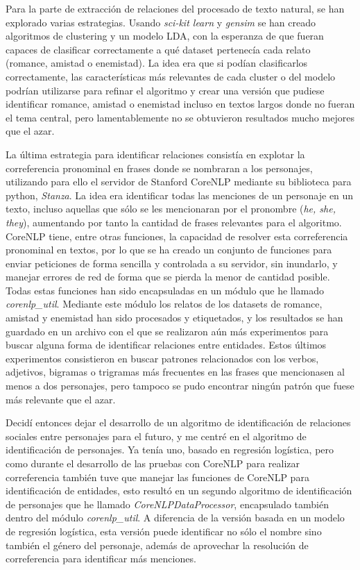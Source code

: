 \documentclass{pre-tfg}
\begin{document}
Para la parte de extracción de relaciones del procesado de texto natural, se han explorado varias estrategias. Usando \textit{sci-kit learn} y \textit{gensim} se han creado algoritmos de clustering y un modelo LDA, con la esperanza de que fueran capaces de clasificar correctamente a qué dataset pertenecía cada relato (romance, amistad o enemistad). La idea era que si podían clasificarlos correctamente, las características más relevantes de cada cluster o del modelo podrían utilizarse para refinar el algoritmo y crear una versión que pudiese identificar romance, amistad o enemistad incluso en textos largos donde no fueran el tema central, pero lamentablemente no se obtuvieron resultados mucho mejores que el azar.

La última estrategia para identificar relaciones consistía en explotar la correferencia pronominal en frases donde se nombraran a los personajes, utilizando para ello el servidor de Stanford CoreNLP mediante su biblioteca para python, \textit{Stanza}. La idea era identificar todas las menciones de un personaje en un texto, incluso aquellas que sólo se les mencionaran por el pronombre (\textit{he, she, they}), aumentando por tanto la cantidad de frases relevantes para el algoritmo. CoreNLP tiene, entre otras funciones, la capacidad de resolver esta correferencia pronominal en textos, por lo que se ha creado un conjunto de funciones para enviar peticiones de forma sencilla y controlada a su servidor, sin inundarlo, y manejar errores de red de forma que se pierda la menor de cantidad posible. Todas estas funciones han sido encapsuladas en un módulo que he llamado \textit{corenlp\_util}. Mediante este módulo los relatos de los datasets de romance, amistad y enemistad han sido procesados y etiquetados, y los resultados se han guardado en un archivo con el que se realizaron aún más experimentos para buscar alguna forma de identificar relaciones entre entidades. Estos últimos experimentos consistieron en buscar patrones relacionados con los verbos, adjetivos, bigramas o trigramas más frecuentes en las frases que mencionasen al menos a dos personajes, pero tampoco se pudo encontrar ningún patrón que fuese más relevante que el azar.

Decidí entonces dejar el desarrollo de un algoritmo de identificación de relaciones sociales entre personajes para el futuro, y me centré en el algoritmo de identificación de personajes. Ya tenía uno, basado en regresión logística, pero como durante el desarrollo de las pruebas con CoreNLP para realizar correferencia también tuve que manejar las funciones de CoreNLP para identificación de entidades, esto resultó en un segundo algoritmo de identificación de personajes que he llamado \textit{CoreNLPDataProcessor}, encapsulado también dentro del módulo \textit{corenlp\_util}. A diferencia de la versión basada en un modelo de regresión logística, esta versión puede identificar no sólo el nombre sino también el género del personaje, además de aprovechar la resolución de correferencia para identificar más menciones.
\end{document}
